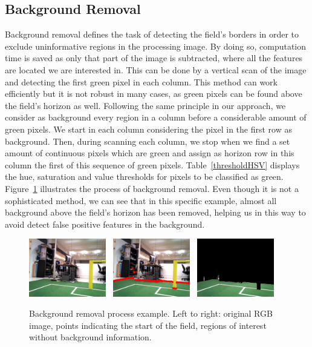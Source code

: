 \documentclass[	DIV=calc,%
							paper=a4,%
							fontsize=9pt,%
							twocolumn]{scrartcl}	 					%
\begin{document}
\subsection{Background Removal}
Background removal defines the task of detecting the field's borders in order to exclude uninformative regions in the processing image. By doing so, computation time is saved as only that part of the image is subtracted, where all the features are located we are interested in. This can be done by a vertical scan of the image and detecting the first green pixel in each column. This method can work efficiently but it is not robust in many cases, as green pixels can be found above the field's horizon as well. Following the same principle in our approach, we consider as background every region in a column before a considerable amount of green pixels. We start in each column considering the pixel in the first row as background. Then, during scanning each column, we stop when we find a set amount of continuous pixels which are green and assign as horizon row in this column the first of this sequence of green pixels.  Table~\ref{thresholdHSV} displays the hue, saturation and value thresholds for pixels to be classified as green. Figure~\ref{background} illustrates the process of background removal. Even though it is not a sophisticated method, we can see that in this specific example, almost all background above the field's horizon has been removed, helping us in this way to avoid detect false positive features in the background.

\begin{figure}[t!]
\caption{Background removal process example. Left to right: original RGB image, points indicating the start of the field, regions of interest without background information.}
\label{background}
\centering    
\includegraphics[width=0.3\textwidth]{figures/original.png} \	
\includegraphics[width=0.3\textwidth]{figures/back.png} \	
\includegraphics[width=0.3\textwidth]{figures/back_fixed.png}	
\end{figure}
\end{document}
